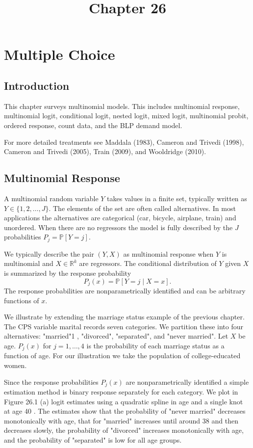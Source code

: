 \documentclass[10pt]{article}
\title{Chapter 26 }
\author{}
\date{}
\begin{document}
\maketitle
\section{Multiple Choice}
\subsection{Introduction}
This chapter surveys multinomial models. This includes multinomial response, multinomial logit, conditional logit, nested logit, mixed logit, multinomial probit, ordered response, count data, and the BLP demand model.

For more detailed treatments see Maddala (1983), Cameron and Trivedi (1998), Cameron and Trivedi (2005), Train (2009), and Wooldridge (2010).

\subsection{Multinomial Response}
A multinomial random variable $Y$ takes values in a finite set, typically written as $Y \in\{1,2, \ldots, J\}$. The elements of the set are often called alternatives. In most applications the alternatives are categorical (car, bicycle, airplane, train) and unordered. When there are no regressors the model is fully described by the $J$ probabilities $P_{j}=\mathbb{P}[Y=j]$.

We typically describe the pair $(Y, X)$ as multinomial response when $Y$ is multinomial and $X \in \mathbb{R}^{k}$ are regressors. The conditional distribution of $Y$ given $X$ is summarized by the response probability
$$
P_{j}(x)=\mathbb{P}[Y=j \mid X=x] .
$$
The response probabilities are nonparametrically identified and can be arbitrary functions of $x$.

We illustrate by extending the marriage status example of the previous chapter. The CPS variable marital records seven categories. We partition these into four alternatives: "married"1 , "divorced", "separated", and "never married". Let $X$ be age. $P_{j}(x)$ for $j=1, \ldots, 4$ is the probability of each marriage status as a function of age. For our illustration we take the population of college-educated women.

Since the response probabilities $P_{j}(x)$ are nonparametrically identified a simple estimation method is binary response separately for each category. We plot in Figure 26.1 (a) logit estimates using a quadratic spline in age and a single knot at age 40 . The estimates show that the probability of "never married" decreases monotonically with age, that for "married" increases until around 38 and then decreases slowly, the probability of "divorced" increases monotonically with age, and the probability of "separated" is low for all age groups.
\end{document}
